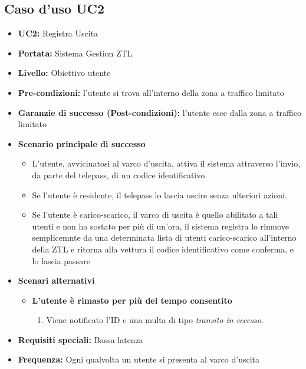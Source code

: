 \documentclass[12pt, letterpaper]{article}
\begin{document}
\subsection{Caso d'uso UC2}
\begin{itemize}
    \item \textbf{UC2:} Registra Uscita
    \item \textbf{Portata:} Sistema Gestion ZTL
    \item \textbf{Livello:} Obiettivo utente
    \item \textbf{Pre-condizioni:} l'utente si trova 
    all'interno della zona a traffico limitato
    \item \textbf{Garanzie di successo (Post-condizioni):} 
    l'utente esce dalla zona a traffico limitato
    \item \textbf{Scenario principale di successo}
    \begin{itemize}
        \item L'utente, avvicinatosi al varco d'uscita, 
        attiva il sistema attraverso l'invio, 
        da parte del telepass, di un codice identificativo
        \item Se l'utente è residente, il telepass lo 
        lascia uscire senza ulteriori azioni.
        \item Se l'utente è carico-scarico, il varco di uscita 
        è quello abilitato a tali utenti e non ha sostato per 
        più di un'ora, il sistema registra lo rimuove 
        semplicemnte da una determinata lista di utenti 
        carico-scarico all'interno della ZTL e ritorna alla 
        vettura il codice identificativo come conferma, e 
        lo lascia passare
    \end{itemize}    
    \item \textbf{Scenari alternativi}
    \begin{itemize}
        \item \textbf{L'utente è rimasto per più del 
        tempo consentito}
        \begin{enumerate}
            \item Viene notificato l'ID e una multa di 
            tipo \emph{transito in eccesso}.
        \end{enumerate}
    \end{itemize}
    
    \item \textbf{Requisiti speciali:} Bassa latenza
    \item \textbf{Frequenza:} Ogni qualvolta un utente 
    si presenta al varco d'uscita 
\end{itemize}
    
\end{document}

